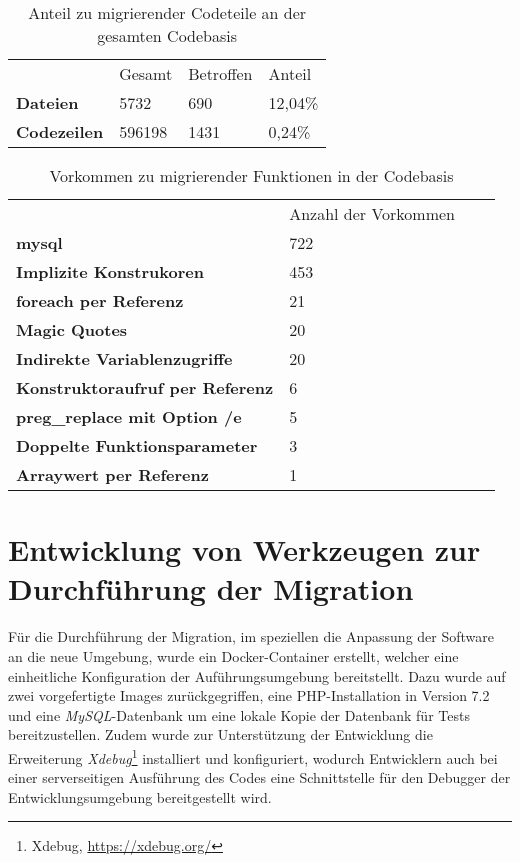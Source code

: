 \begin{table}
    \centering
    \caption{Anteil zu migrierender Codeteile an der gesamten Codebasis}
    \label{tab:migrationPercentage}
    \begin{tabular}{llll}
                        & Gesamt & Betroffen & Anteil   \\
    \textbf{Dateien}    & 5732   & 690       & 12,04\%  \\
    \textbf{Codezeilen} & 596198 & 1431      & 0,24\%  
    \end{tabular}
\end{table}

\begin{table}
    \centering
    \caption{Vorkommen zu migrierender Funktionen in der Codebasis}
    \label{tab:migrationFunctions}
    \begin{tabular}{llll}
                                            & Anzahl der Vorkommen \\
    \textbf{mysql}                          & 722 \\
    \textbf{Implizite Konstrukoren}         & 453 \\
    \textbf{foreach per Referenz}           & 21 \\
    \textbf{Magic Quotes}                   & 20 \\
    \textbf{Indirekte Variablenzugriffe}    & 20 \\
    \textbf{Konstruktoraufruf per Referenz} & 6 \\
    \textbf{preg\_replace mit Option /e}    & 5 \\
    \textbf{Doppelte Funktionsparameter}    & 3 \\
    \textbf{Arraywert per Referenz}         & 1 \\
    \end{tabular}
\end{table}

\section{Entwicklung von Werkzeugen zur Durchführung der Migration}
Für die Durchführung der Migration, im speziellen die Anpassung der Software an die neue Umgebung, wurde ein Docker-Container 
erstellt, welcher eine einheitliche Konfiguration der Auführungsumgebung bereitstellt. Dazu wurde auf zwei vorgefertigte 
Images zurückgegriffen, eine \ac{PHP}-Installation in Version 7.2 und eine \textit{MySQL}-Datenbank um eine lokale Kopie 
der Datenbank für Tests bereitzustellen. Zudem wurde zur Unterstützung der Entwicklung die Erweiterung \textit{Xdebug}\footnote{Xdebug, \url{https://xdebug.org/}} 
installiert und konfiguriert, wodurch Entwicklern auch bei einer serverseitigen Ausführung des Codes eine Schnittstelle 
für den Debugger der Entwicklungsumgebung bereitgestellt wird.

